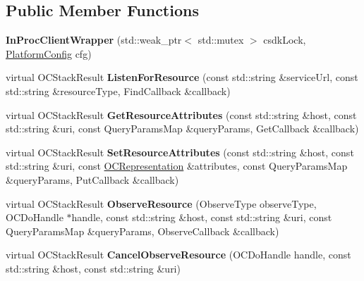 \subsection*{Public Member Functions}
\begin{DoxyCompactItemize}
\item 
\hypertarget{classOC_1_1InProcClientWrapper_a2966d3f07af9340453c0e3e4b5e4b8cd}{}{\bfseries In\+Proc\+Client\+Wrapper} (std\+::weak\+\_\+ptr$<$ std\+::mutex $>$ csdk\+Lock, \hyperlink{structOC_1_1PlatformConfig}{Platform\+Config} cfg)\label{classOC_1_1InProcClientWrapper_a2966d3f07af9340453c0e3e4b5e4b8cd}

\item 
\hypertarget{classOC_1_1InProcClientWrapper_a6e701ab260a3b07f86e5baeafce9f989}{}virtual O\+C\+Stack\+Result {\bfseries Listen\+For\+Resource} (const std\+::string \&service\+Url, const std\+::string \&resource\+Type, Find\+Callback \&callback)\label{classOC_1_1InProcClientWrapper_a6e701ab260a3b07f86e5baeafce9f989}

\item 
\hypertarget{classOC_1_1InProcClientWrapper_a25d5b168f2eb4823ac40e0d615a85864}{}virtual O\+C\+Stack\+Result {\bfseries Get\+Resource\+Attributes} (const std\+::string \&host, const std\+::string \&uri, const Query\+Params\+Map \&query\+Params, Get\+Callback \&callback)\label{classOC_1_1InProcClientWrapper_a25d5b168f2eb4823ac40e0d615a85864}

\item 
\hypertarget{classOC_1_1InProcClientWrapper_aea8548cec4ab7de12b7247592e40cd8d}{}virtual O\+C\+Stack\+Result {\bfseries Set\+Resource\+Attributes} (const std\+::string \&host, const std\+::string \&uri, const \hyperlink{classOC_1_1OCRepresentation}{O\+C\+Representation} \&attributes, const Query\+Params\+Map \&query\+Params, Put\+Callback \&callback)\label{classOC_1_1InProcClientWrapper_aea8548cec4ab7de12b7247592e40cd8d}

\item 
\hypertarget{classOC_1_1InProcClientWrapper_a38493494ea5a2049a076aea85466e2b5}{}virtual O\+C\+Stack\+Result {\bfseries Observe\+Resource} (Observe\+Type observe\+Type, O\+C\+Do\+Handle $\ast$handle, const std\+::string \&host, const std\+::string \&uri, const Query\+Params\+Map \&query\+Params, Observe\+Callback \&callback)\label{classOC_1_1InProcClientWrapper_a38493494ea5a2049a076aea85466e2b5}

\item 
\hypertarget{classOC_1_1InProcClientWrapper_accbae5371c7c5786b6907da6ed634c52}{}virtual O\+C\+Stack\+Result {\bfseries Cancel\+Observe\+Resource} (O\+C\+Do\+Handle handle, const std\+::string \&host, const std\+::string \&uri)\label{classOC_1_1InProcClientWrapper_accbae5371c7c5786b6907da6ed634c52}


\end{DoxyCompactItemize}
